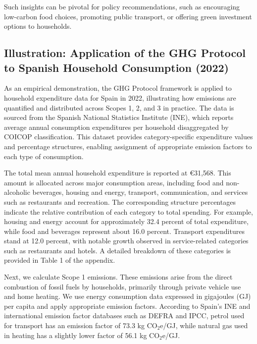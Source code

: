 \documentclass[12pt,a4paper]{article}%
\begin{document}
 Such insights can be pivotal for policy recommendations, such as encouraging low-carbon food choices, promoting public transport, or offering green investment options to households.

\subsection{Illustration: Application of the GHG Protocol to Spanish Household Consumption (2022)}

As an empirical demonstration, the GHG Protocol framework is applied to household expenditure data for Spain in 2022, illustrating how emissions are quantified and distributed across Scopes 1, 2, and 3 in practice. The data is sourced from the Spanish National Statistics Institute (INE), which reports average annual consumption expenditures per household disaggregated by COICOP classification. This dataset provides category-specific expenditure values and percentage structures, enabling assignment of appropriate emission factors to each type of consumption.

The total mean annual household expenditure is reported at €31,568. This amount is allocated across major consumption areas, including food and non-alcoholic beverages, housing and energy, transport, communication, and services such as restaurants and recreation. The corresponding structure percentages indicate the relative contribution of each category to total spending. For example, housing and energy account for approximately 32.4 percent of total expenditure, while food and beverages represent about 16.0 percent. Transport expenditures stand at 12.0 percent, with notable growth observed in service-related categories such as restaurants and hotels. A detailed breakdown of these categories is provided in Table 1 of the appendix.

Next, we calculate Scope 1 emissions. These emissions arise from the direct combustion of fossil fuels by households, primarily through private vehicle use and home heating. We use energy consumption data expressed in gigajoules (GJ) per capita and apply appropriate emission factors. According to Spain’s INE and international emission factor databases such as DEFRA and IPCC, petrol used for transport has an emission factor of 73.3 kg CO$_2$e/GJ, while natural gas used in heating has a slightly lower factor of 56.1 kg CO$_2$e/GJ.

\end{document}
